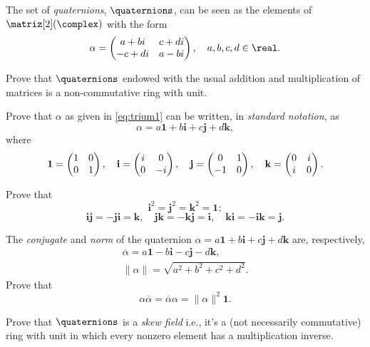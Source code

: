 \documentclass[
    11pt,a4paper,
]{exam}
\begin{document}
\begin{questions}
\begin{ejercicio}
The set of \emph{quaternions}, $\quaternions$, can be seen as the elements of $\matriz[2](\complex)$ with the form
\begin{equation}
\label{eq:trium1}
\alpha = 
\begin{pmatrix}
a+bi & c+di \cr
-c+di & a-bi
\end{pmatrix},\quad a,b,c,d \in \real.
\end{equation}
\begin{my_enumerate}
\item Prove that $\quaternions$ endowed with the usual addition and multiplication of matrices is a non-commutative ring with unit.
\item Prove that $\alpha$ as given in \eqref{eq:trium1}
can be written, in \emph{standard notation}, as
\begin{equation}
\label{eq:fuimr1}
\alpha = a \mathbf{1} + b \mathbf{i} + c\mathbf{j}
+ d \mathbf{k},
\end{equation}
where
$$
\mathbf{1} = \begin{pmatrix} 1 & 0 \cr 0 & 1    \end{pmatrix},\quad
\mathbf{i} =
\begin{pmatrix} i & 0 \cr 0 & -i    \end{pmatrix},\quad
\mathbf{j}=
\begin{pmatrix} 0 & 1 \cr -1 & 0    \end{pmatrix},\quad
\mathbf{k} =
\begin{pmatrix} 0 & i \cr i & 0    \end{pmatrix}.
$$
\item Prove that
\begin{equation}
\mathbf{i}^2 = \mathbf{j}^2 =
\mathbf{k}^2 = \mathbf{1};
\end{equation}
\begin{equation}
\mathbf{i} \mathbf{j} = - \mathbf{j} \mathbf{i} = \mathbf{k},\quad
\mathbf{j} \mathbf{k} = - \mathbf{k} \mathbf{j} = \mathbf{i},\quad
\mathbf{k} \mathbf{i} = - \mathbf{i} \mathbf{k} = \mathbf{j}.
\end{equation}
\item The \emph{conjugate} and \emph{norm} of the quaternion $\alpha = a \mathbf{1} + b \mathbf{i} + c\mathbf{j}
+ d \mathbf{k}$ are, respectively,
\begin{eqnarray}
\overline{\alpha} = a \mathbf{1} - b \mathbf{i} - c\mathbf{j}
- d \mathbf{k},
\\
\|\alpha\| = \sqrt{a^2 + b^2 + c^2 + d^2}.
\end{eqnarray}
Prove that 
$$
\alpha \overline{\alpha} = \overline{\alpha} \alpha = \|\alpha\|^2 \mathbf{1}.
$$
\item Prove that $\quaternions$ is a \emph{skew field} i.e., it's a (not necessarily commutative) ring with unit in which every nonzero element has a multiplication inverse.
\end{my_enumerate}
\end{ejercicio}


\end{questions}
\end{document}
